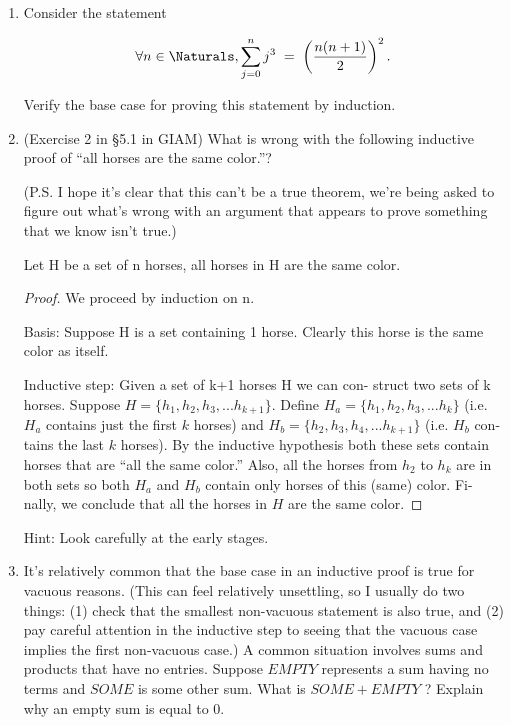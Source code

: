 \documentclass{amsart}
\begin{document}
\begin{enumerate}
\begin{enumerate}
\vfill

\end{enumerate}

\item Consider the statement

\[ \forall n \in \Naturals, \sum_{j=0}^{n} j^3 \; = \; \left( \frac{n(n + 1)}{2} \right)^2. \]

Verify the base case for proving this statement by induction.

\vfill


\newpage

\item (Exercise 2 in \S 5.1 in GIAM) What is wrong with the following
inductive proof of ``all horses are the same color.''?

(P.S. I hope it’s clear that this can’t be a true theorem, we’re
being asked to figure out what’s wrong with an argument that
appears to prove something that we know isn’t true.)

\begin{thm*}
 Let H be a set of n horses, all horses in H are the
same color.
\end{thm*}

\begin{proof}
We proceed by induction on n.

Basis: \newline
Suppose H is a set containing 1 horse. Clearly
this horse is the same color as itself.

Inductive step: \newline
Given a set of k+1 horses H we can con-
struct two sets of k horses. Suppose $H = \{h_1 , h_2 , h_3 , . . . h_{k+1} \}$.
Define $H_a = \{h_1 , h_2 , h_3 , . . . h_{k} \}$ (i.e. $H_a$ contains just the
first $k$ horses) and $H_b = \{h_2 , h_3 , h_4 , . . . h_{k+1} \}$ (i.e. $H_b$ con-
tains the last $k$ horses). By the inductive hypothesis both
these sets contain horses that are “all the same color.”
Also, all the horses from $h_2$ to $h_k$ are in both sets so both
$H_a$ and $H_b$ contain only horses of this (same) color. Fi-
nally, we conclude that all the horses in $H$ are the same
color.
\end{proof}


Hint: Look carefully at the early stages.

\vfill

\newpage

\item It’s relatively common that the base case in an inductive proof is
true for vacuous reasons. (This can feel relatively unsettling, so
I usually do two things: (1) check that the smallest non-vacuous
statement is also true, and (2) pay careful attention in the inductive
step to seeing that the vacuous case implies the first non-vacuous
case.) A common situation involves sums and products that have
no entries. Suppose $EMPTY$ represents a sum having no terms
and $SOME$ is some other sum. What is $SOME + EMPTY$ ?
Explain why an empty sum is equal to 0.


\end{enumerate}
\end{document}
